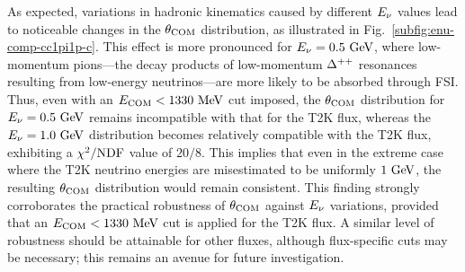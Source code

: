      As expected, variations in hadronic kinematics caused by different $E_{\nu}$ values lead to noticeable changes in the $\theta_{\textrm{COM}}$ distribution, as illustrated in Fig.~\ref{subfig:enu-comp-cc1pi1p-c}.
     This effect is more pronounced for $E_{\nu}=0.5~\textrm{GeV}$, where low-momentum pions—the decay products of low-momentum $\Delta^{++}$ resonances resulting from low-energy neutrinos—are more likely to be absorbed through FSI.
     Thus, even with an $E_{\textrm{COM}} < 1330~\textrm{MeV}$ cut imposed, the $\theta_{\textrm{COM}}$ distribution for $E_{\nu}=0.5~\textrm{GeV}$ remains incompatible with that for the T2K flux, whereas the $E_{\nu}=1.0~\textrm{GeV}$ distribution becomes relatively compatible with the T2K flux, exhibiting a $\chi^2/{\textrm{NDF}}$ value of $20/8$.
     This implies that even in the extreme case where the T2K neutrino energies are misestimated to be uniformly $1~\textrm{GeV}$, the resulting $\theta_{\textrm{COM}}$ distribution would remain consistent.
     This finding strongly corroborates the practical robustness of $\theta_{\textrm{COM}}$ against $E_{\nu}$ variations, provided that an $E_{\textrm{COM}} < 1330~\textrm{MeV}$ cut is applied for the T2K flux.
     A similar level of robustness should be attainable for other fluxes, although flux-specific cuts may be necessary; this remains an avenue for future investigation.

